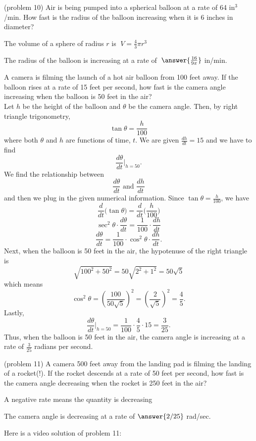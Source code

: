 \documentclass[handout]{ximera}
\begin{document}
\begin{problem}(problem 10)
Air is being pumped into a spherical balloon at a rate of 64 in$^3$/min. How fast is the radius of the balloon
increasing when it is 6 inches in diameter?\\

\begin{hint}
The volume of a sphere of radius $r$ is $\; V = \frac43 \pi r^3$
\end{hint}

The radius of the balloon is increasing at a rate of $\;\answer{\frac{16}{9\pi}}$ in/min.
\end{problem}



\begin{example}[example 11]
A camera is filming the launch of a hot air balloon from 100 feet away. 
If the balloon rises at a rate of 15 feet per second, how fast is the camera angle increasing when the balloon is 50 feet in the air?\\
Let $h$ be the height of the balloon and $\theta$ be the camera angle. Then, by right triangle trigonometry, 
\[\tan \theta  = \frac{h}{100}\]
where both $\theta$ and $h$ are functions of time, $t$.
We are given $\frac{dh}{dt} = 15$ and we have to find
\[\frac{d\theta}{dt}\bigg|_{h = 50}.\]
We find the relationship between 
\[\frac{d\theta}{dt} \text{ and } \frac{dh}{dt}\]
and then we plug in the given numerical information.
Since $\tan\theta = \frac{h}{100}$, we have
\[\frac{d}{dt}\big(\tan\theta\big) = \frac{d}{dt} \Big(\frac{h}{100}\Big)\]
 \[\sec^2 \theta \cdot \frac{d\theta}{dt} = \frac{1}{100} \cdot \frac{dh}{dt}\]
\[ \frac{d\theta}{dt} = \frac{1}{100}\cdot\cos^2 \theta  \cdot\frac{dh}{dt}.\]
Next, when the balloon is 50 feet in the air, the hypotenuse of the right triangle is 
\[\sqrt{100^2 + 50^2} = 50\sqrt{2^2 + 1^2} = 50\sqrt 5\]
which means 
\[\cos^2 \theta = \left(\frac{100}{50\sqrt 5}\right)^2 = \left(\frac{2}{\sqrt 5}\right)^2 = \frac45.\]
Lastly,
\[\frac{d\theta}{dt}\bigg|_{h = 50}= \frac{1}{100} \cdot \frac45 \cdot 15 = \frac{3}{25}.\]
Thus, when the balloon is 50 feet in the air, the camera angle is increasing at a rate of $\frac{3}{25}$ radians per second.
\end{example}


\begin{problem}(problem 11)
A camera 500 feet away from the landing pad is filming the landing of a rocket(!).
If the rocket descends at a rate of 50 feet per second, how fast is the camera angle decreasing when the 
rocket is 250 feet in the air?\\

\begin{hint} 
A negative rate means the quantity is decreasing
\end{hint}

The camera angle is decreasing at a rate of $\answer{2/25}$ rad/sec.

Here is a video solution of  problem 11:
\begin{foldable}
\end{foldable}

\end{problem}
\end{document}
